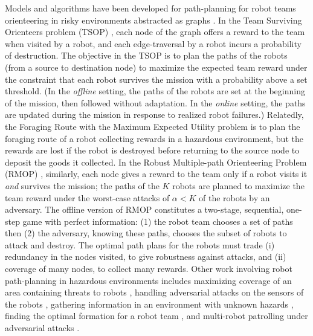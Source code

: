 \documentclass[11pt, oneside]{article}
\begin{document}
Models and algorithms have been developed for path-planning for robot teams orienteering in risky environments abstracted as graphs \cite{zhou2021multi}. 
In the Team Surviving Orienteers problem (TSOP) \cite{jorgensen2018team,jorgensen2017matroid,jorgensen2024matroid}, each node of the graph offers a reward to the team when visited by a robot, and each edge-traversal by a robot incurs a probability of destruction. 
The objective in the TSOP is to plan the paths of the robots (from a source to destination node) to maximize the expected team reward under the constraint that each robot survives the mission with a probability above a set threshold. 
(In the \emph{offline} setting, the paths of the robots are set at the beginning of the mission, then followed without adaptation. In the \emph{online} setting, the paths are updated during the mission in response to realized robot failures.)
Relatedly, the Foraging Route with the Maximum Expected Utility problem \cite{di2022foraging} is to plan the foraging route of a robot collecting rewards in a hazardous environment, but the rewards are lost if the robot is destroyed before returning to the source node to deposit the goods it collected.
In the Robust Multiple-path Orienteering Problem (RMOP) \cite{shi2023robust}, similarly, each node gives a reward to the team only if a robot visits it \emph{and} survives the mission; the paths of the $K$ robots are planned to maximize the team reward under the worst-case attacks of $\alpha<K$ of the robots by an adversary. 
The offline version of RMOP constitutes a two-stage, sequential, one-step game with perfect information: (1) the robot team chooses a set of paths then (2) the adversary, knowing these paths, chooses the subset of robots to attack and destroy. 
The optimal path plans for the robots must trade (i) redundancy in the nodes visited, to give robustness against attacks, and (ii) coverage of many nodes, to collect many rewards.
Other work involving robot path-planning in hazardous environments includes 
maximizing coverage of an area containing threats to robots \cite{korngut2023multi,yehoshua2016robotic}, 
handling adversarial attacks on the sensors of the robots \cite{liu2021distributed,zhou2022distributed,mayya2022adaptive,zhou2018resilient}, 
gathering information in an environment with unknown hazards \cite{schwager2017multi},
finding the optimal formation for a robot team \cite{shapira2015path},
and 
multi-robot patrolling under adversarial attacks \cite{huang2019survey}.
\end{document}
